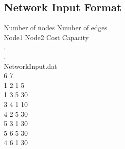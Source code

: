 \documentclass[10pt,a4paper,margin = 1.25cm]{article}
\begin{document}
\subsection*{Network Input Format}
Number of nodes \quad Number of edges\\
Node1 \quad Node2 \quad Cost \quad  Capacity\\
.\\
.\\
NetworkInput.dat\\
6 7\\
1 2 1 5\\
1 3 5 30\\
3 4 1 10\\
4 2 5 30\\
5 3 1 30\\
5 6 5 30\\
4 6 1 30\\
\end{document}
